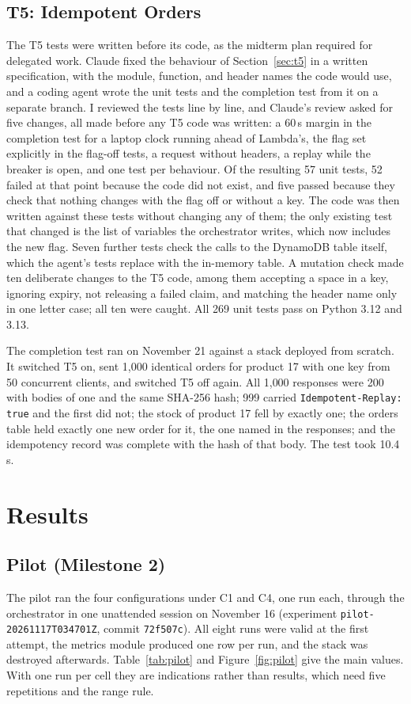 \documentclass[10pt]{article}
\begin{document}
\subsection{T5: Idempotent Orders}\label{sec:t5-test}
The T5 tests were written before its code, as the midterm plan required for
delegated work. Claude fixed the behaviour of Section~\ref{sec:t5} in a
written specification, with the module, function, and header names the code
would use, and a coding agent wrote the unit tests and the completion test
from it on a separate branch. I reviewed the tests line by line, and Claude's
review asked for five changes, all made before any T5 code was written: a
60\,s margin in the completion test for a laptop clock running ahead of
Lambda's, the flag set explicitly in the flag-off tests, a request without
headers, a replay while the breaker is open, and one test per behaviour. Of
the resulting 57 unit tests, 52 failed at that point because the code did not
exist, and five passed because they check that nothing changes with the flag
off or without a key. The code was then written against
these tests without changing any of them; the only existing test that changed
is the list of variables the orchestrator writes, which now includes the new
flag. Seven further tests check the calls to the DynamoDB table itself, which
the agent's tests replace with the in-memory table. A mutation check made ten
deliberate changes to the T5 code, among them accepting a space in a key,
ignoring expiry, not releasing a failed claim, and matching the header name
only in one letter case; all ten were caught. All 269 unit tests pass on
Python 3.12 and 3.13.

The completion test ran on November 21 against a stack deployed from scratch.
It switched T5 on, sent 1{,}000 identical orders for product 17 with one key
from 50 concurrent clients, and switched T5 off again. All 1{,}000 responses
were 200 with bodies of one and the same SHA-256 hash; 999 carried
\texttt{Idempotent-Replay: true} and the first did not; the stock of product 17
fell by exactly one; the orders table held exactly one new order for it, the
one named in the responses; and the idempotency record was complete with the
hash of that body. The test took 10.4\,s.

\section{Results}
\subsection{Pilot (Milestone 2)}
The pilot ran the four configurations under C1 and C4, one run each, through
the orchestrator in one unattended session on November 16 (experiment
\texttt{pilot-20261117T034701Z}, commit \texttt{72f507c}). All eight runs were
valid at the first attempt, the metrics module produced one row per run, and
the stack was destroyed afterwards. Table~\ref{tab:pilot} and
Figure~\ref{fig:pilot} give the main values. With one run per cell they are indications rather than results, which
need five repetitions and the range rule.
\end{document}
